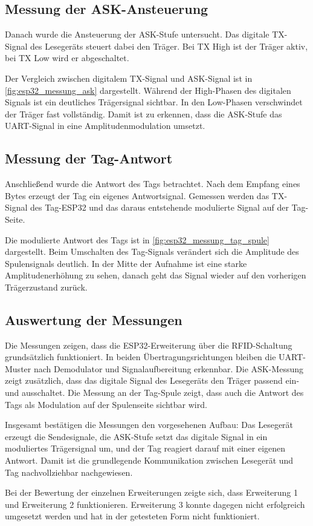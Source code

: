 \subsection{Messung der ASK-Ansteuerung}
Danach wurde die Ansteuerung der ASK-Stufe untersucht. Das digitale TX-Signal des Lesegeräts steuert dabei den Träger. Bei TX High ist der Träger aktiv, bei TX Low wird er abgeschaltet.


Der Vergleich zwischen digitalem TX-Signal und ASK-Signal ist in \cref{fig:esp32_messung_ask} dargestellt. Während der High-Phasen des digitalen Signals ist ein deutliches Trägersignal sichtbar. In den Low-Phasen verschwindet der Träger fast vollständig. Damit ist zu erkennen, dass die ASK-Stufe das UART-Signal in eine Amplitudenmodulation umsetzt.

\subsection{Messung der Tag-Antwort}
Anschließend wurde die Antwort des Tags betrachtet. Nach dem Empfang eines Bytes erzeugt der Tag ein eigenes Antwortsignal. Gemessen werden das TX-Signal des Tag-ESP32 und das daraus entstehende modulierte Signal auf der Tag-Seite.

Die modulierte Antwort des Tags ist in \cref{fig:esp32_messung_tag_spule} dargestellt. Beim Umschalten des Tag-Signals verändert sich die Amplitude des Spulensignals deutlich. In der Mitte der Aufnahme ist eine starke Amplitudenerhöhung zu sehen, danach geht das Signal wieder auf den vorherigen Trägerzustand zurück.

\subsection{Auswertung der Messungen}
Die Messungen zeigen, dass die ESP32-Erweiterung über die RFID-Schaltung grundsätzlich funktioniert. In beiden Übertragungsrichtungen bleiben die UART-Muster nach Demodulator und Signalaufbereitung erkennbar. Die ASK-Messung zeigt zusätzlich, dass das digitale Signal des Lesegeräts den Träger passend ein- und ausschaltet. Die Messung an der Tag-Spule zeigt, dass auch die Antwort des Tags als Modulation auf der Spulenseite sichtbar wird.

Insgesamt bestätigen die Messungen den vorgesehenen Aufbau: Das Lesegerät erzeugt die Sendesignale, die ASK-Stufe setzt das digitale Signal in ein moduliertes Trägersignal um, und der Tag reagiert darauf mit einer eigenen Antwort. Damit ist die grundlegende Kommunikation zwischen Lesegerät und Tag nachvollziehbar nachgewiesen.

Bei der Bewertung der einzelnen Erweiterungen zeigte sich, dass Erweiterung 1 und Erweiterung 2 funktionieren. Erweiterung 3 konnte dagegen nicht erfolgreich umgesetzt werden und hat in der getesteten Form nicht funktioniert.
